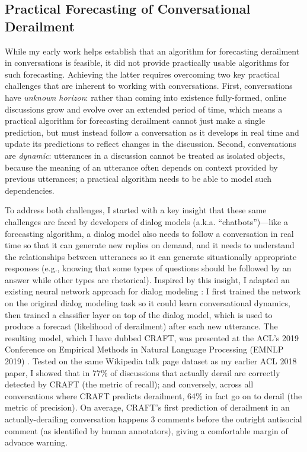 \documentclass[11pt,letterpaper]{article}
\begin{document}
\subsection{Practical Forecasting of Conversational Derailment}
While my early work helps establish that an algorithm for forecasting derailment in conversations is feasible, it did not provide practically usable algorithms for such forecasting.
Achieving the latter requires overcoming two key practical challenges that are inherent to working with conversations.
First, conversations have \emph{unknown horizon}: rather than coming into existence fully-formed, online discussions grow and evolve over an extended period of time, which means a practical algorithm for forecasting derailment cannot just make a single prediction, but must instead follow a conversation as it develops in real time and update its predictions to reflect changes in the discussion.
Second, conversations are \emph{dynamic}: utterances in a discussion cannot be treated as isolated objects, because the meaning of an utterance often depends on context provided by previous utterances; a practical algorithm needs to be able to model such dependencies.

To address both challenges, I started with a key insight that these same challenges are faced by developers of dialog models (a.k.a. ``chatbots'')---like a forecasting algorithm, a dialog model also needs to follow a conversation in real time so that it can generate new replies on demand, and it needs to understand the relationships between utterances so it can generate situationally appropriate responses (e.g., knowing that some types of questions should be followed by an answer while other types are rhetorical).
Inspired by this insight, I adapted an existing neural network approach for dialog modeling \cite{serban_building_2016}: I first trained the network on the original dialog modeling task so it could learn conversational dynamics, then trained a classifier layer on top of the dialog model, which is used to produce a forecast (likelihood of derailment) after each new utterance.
The resulting model, which I have dubbed CRAFT, was presented at the ACL's 2019 Conference on Empirical Methods in Natural Language Processing (EMNLP 2019) \cite{chang_trouble_2019}.
Tested on the same Wikipedia talk page dataset as my earlier ACL 2018 paper, I showed that in 77\% of discussions that actually derail are correctly detected by CRAFT (the metric of recall); and conversely, across all conversations where CRAFT predicts derailment, 64\% in fact go on to derail (the metric of precision).
On average, CRAFT's first prediction of derailment in an actually-derailing conversation happens 3 comments before the outright antisocial comment (as identified by human annotators), giving a comfortable margin of advance warning.
\end{document}
